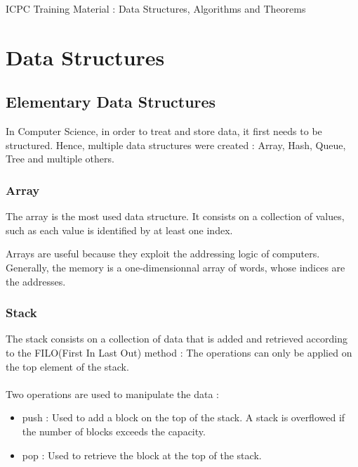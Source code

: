 \documentclass[10pt,landscape,twocolumn]{article}
\begin{document}
\begin{center}
	\Large ICPC Training Material : Data Structures, Algorithms and Theorems 
\end{center}

\tableofcontents

\section{Data Structures}

\subsection{Elementary Data Structures}
In Computer Science, in order to treat and store data, it first needs to be structured. Hence, multiple data structures were created : Array, Hash, Queue, Tree and multiple others.

\subsubsection{Array}
The array is the most used data structure. It consists on a collection of values, such as each value is identified by at least one index. 
\begin{center}
\end{center}
Arrays are useful because they exploit the addressing logic of computers. Generally, the memory is a one-dimensionnal array of words, whose indices are the addresses. 

\subsubsection{Stack}

The stack consists on a collection of data that is added and retrieved according to the FILO(First In Last Out) method : The operations can only be applied on the top element of the stack. \\ \\
Two operations are used to manipulate the data :
\begin{itemize}
	\item push : Used to add a block on the top of the stack. A stack is overflowed if the number of blocks exceeds the capacity.  
	\item pop : Used to retrieve the block at the top of the stack.
\end{itemize}
\end{document}
